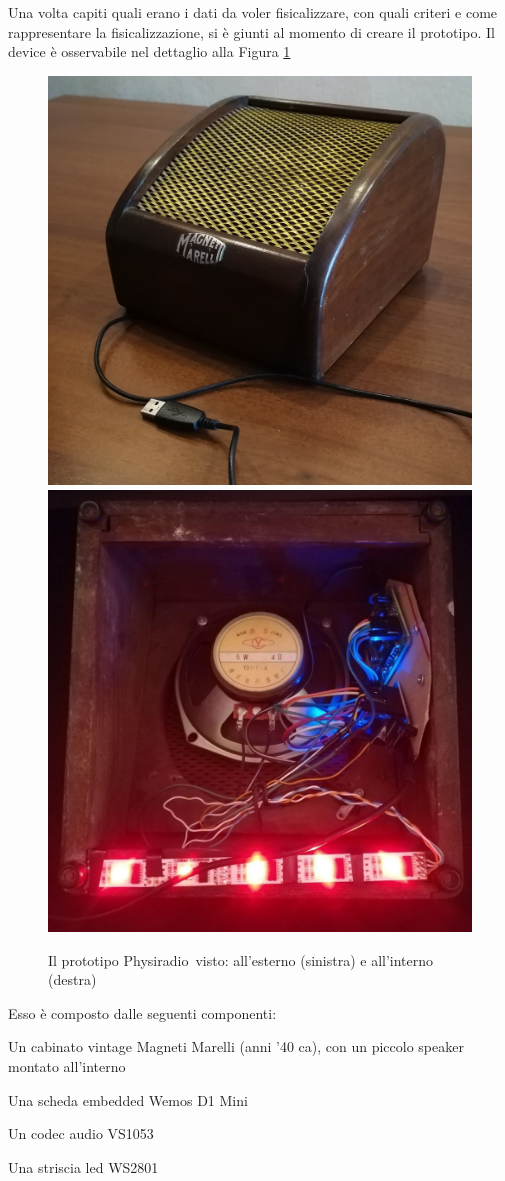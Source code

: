 \documentclass[12pt,a4paper]{report}
\newcommand{\physiradio}{Physiradio} %
\begin{document}
Una volta capiti quali erano i dati da voler fisicalizzare, con quali criteri e come rappresentare la fisicalizzazione, si è giunti al momento di creare il prototipo. Il device è osservabile nel dettaglio alla Figura \ref{fig:physiradio}
\bigskip
\begin{figure}[H]
	\begin{center}
		\centerline
		{
			\includegraphics[width=.500\textwidth]{Immagini/Foto_Physiradio/old/MagnetiMarelli_1.jpg}
			\includegraphics[width=.463\textwidth]{Immagini/Foto_Physiradio/old/MagnetiMarelliLed_2.jpg}
		}
		\caption{Il prototipo \physiradio\ visto: all'esterno (sinistra) e all'interno (destra)}
		\label{fig:physiradio}
	\end{center}
\end{figure}

Esso è composto dalle seguenti componenti: 
\begin{compactitem}
	\item Un cabinato vintage Magneti Marelli (anni '40 ca), con un piccolo speaker montato all'interno
	\item Una scheda embedded Wemos D1 Mini
	\item Un codec audio VS1053
	\item Una striscia led WS2801
\end{compactitem}
\end{document}
